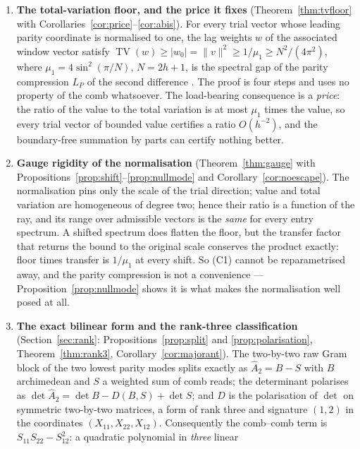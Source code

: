 \documentclass[11pt,a4paper]{article}
\theoremstyle{plain}
\theoremstyle{definition}
\newcommand{\Ah}{\widehat{A}}
\newcommand{\TV}{\operatorname{TV}}
\begin{document}
\begin{enumerate}[label=(C\arabic*),leftmargin=3.1em]
\item\label{C:floor} \textbf{The total-variation floor, and the price it
  fixes} (Theorem~\ref{thm:tvfloor} with
  Corollaries~\ref{cor:price}--\ref{cor:abis}). For every trial vector whose
  leading parity coordinate is normalised to one, the lag weights $w$ of the
  associated window vector satisfy
  $\TV(w)\ge|w_0|=\lVert v\rVert^{2}\ge1/\mu_1\ge N^{2}/(4\pi^{2})$, where
  $\mu_1=4\sin^{2}(\pi/N)$, $N=2h+1$, is the spectral gap of the parity
  compression $L_P$ of the second difference \cite{KMS1953}. The proof is four
  steps and uses no property of the comb whatsoever. The load-bearing
  consequence is a \emph{price}: the ratio of the value to the total variation
  is at most $\mu_1$ times the value, so every trial vector of bounded value
  certifies a ratio $O(h^{-2})$, and the boundary-free summation by parts
  \cite{Abel1826} can certify nothing better.
\item\label{C:gauge} \textbf{Gauge rigidity of the normalisation}
  (Theorem~\ref{thm:gauge} with
  Propositions~\ref{prop:shift}--\ref{prop:nullmode} and
  Corollary~\ref{cor:noescape}). The normalisation pins only the scale of the
  trial direction; value and total variation are homogeneous of degree two;
  hence their ratio is a function of the ray, and its range over admissible
  vectors is the \emph{same} for every entry spectrum. A shifted spectrum does
  flatten the floor, but the transfer factor that returns the bound to the
  original scale conserves the product exactly: floor times transfer is
  $1/\mu_1$ at every shift. So (C1) cannot be reparametrised away, and the
  parity compression is not a convenience --- Proposition~\ref{prop:nullmode}
  shows it is what makes the normalisation well posed at all.
\item\label{C:rank} \textbf{The exact bilinear form and the rank-three
  classification} (Section~\ref{sec:rank}: Propositions~\ref{prop:split} and
  \ref{prop:polarisation}, Theorem~\ref{thm:rank3},
  Corollary~\ref{cor:majorant}). The two-by-two raw Gram block of the two lowest
  parity modes splits exactly as $\Ah_2=B-S$ with $B$ archimedean and $S$ a
  weighted sum of comb reads; the determinant polarises as
  $\det\Ah_2=\det B-D(B,S)+\det S$; and $D$ is the polarisation of $\det$ on
  symmetric two-by-two matrices, a form of rank three and signature $(1,2)$ in
  the coordinates $(X_{11},X_{22},X_{12})$. Consequently the comb--comb term is
  $S_{11}S_{22}-S_{12}^{2}$: a quadratic polynomial in \emph{three} linear

\end{enumerate}
\end{document}
